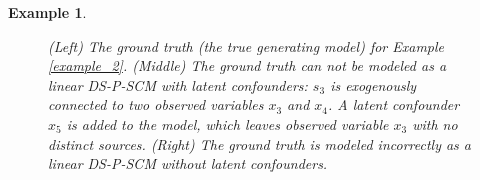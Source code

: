 \documentclass[12pt]{article}
\newtheorem{example}{Example}
\begin{document}
\begin{example}
\begin{figure}[t]
\hspace{3em}
\caption{(Left) The ground truth (the true generating model) for Example \ref{example_2}. (Middle) The ground truth can not be modeled as a linear DS-P-SCM with latent confounders: $s_3$ is exogenously connected to two observed variables $x_3$ and $x_4$. A latent confounder $x_5$ is added to the model, which leaves observed variable $x_3$ with no distinct sources. (Right) The ground truth is modeled incorrectly as a linear DS-P-SCM without latent confounders.}
\label{fig:example2}
\end{figure}
\end{example}
\end{document}
